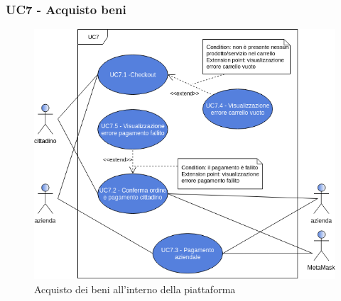 \subsubsection{UC7 - Acquisto beni}
\begin{figure}[h]
	\includegraphics[width=14cm]{res/images/UC7-Generale.png}
	\centering
	\caption{Acquisto dei beni all'interno della piattaforma}
\end{figure}
